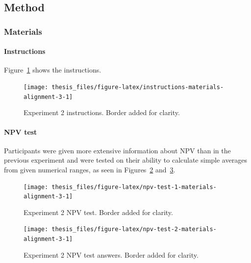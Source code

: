 \documentclass[a4paper, nobind, dvipsnames]{templates/ociamthesis}
\theoremstyle{definition}
\theoremstyle{definition}
\theoremstyle{definition}
\theoremstyle{definition}
\theoremstyle{remark}
\begin{document}
\hypertarget{method-11}{%
\subsection{Method}\label{method-11}}

\hypertarget{materials-10}{%
\subsubsection{Materials}\label{materials-10}}

\hypertarget{instructions-materials-alignment-3-appendix}{%
\paragraph{Instructions}\label{instructions-materials-alignment-3-appendix}}

Figure~\ref{fig:instructions-materials-alignment-3} shows the instructions.



\begin{figure}
\texttt{[image: thesis\_files/figure-latex/instructions-materials-alignment-3-1]} \caption{Experiment 2 instructions. Border added for clarity.}\label{fig:instructions-materials-alignment-3}
\end{figure}

\hypertarget{npv-test-materials-alignment-3}{%
\paragraph{NPV test}\label{npv-test-materials-alignment-3}}

Participants were given more extensive information about NPV than in the
previous experiment and were tested on their ability to calculate simple
averages from given numerical ranges, as seen in
Figures~\ref{fig:npv-test-1-materials-alignment-3}
and~\ref{fig:npv-test-2-materials-alignment-3}.



\begin{figure}
\texttt{[image: thesis\_files/figure-latex/npv-test-1-materials-alignment-3-1]} \caption{Experiment 2 NPV test. Border added for clarity.}\label{fig:npv-test-1-materials-alignment-3}
\end{figure}



\begin{figure}
\texttt{[image: thesis\_files/figure-latex/npv-test-2-materials-alignment-3-1]} \caption{Experiment 2 NPV test answers. Border added for clarity.}\label{fig:npv-test-2-materials-alignment-3}
\end{figure}
\end{document}
